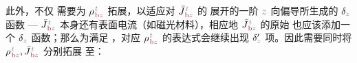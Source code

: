 此外，不仅  需要为 ${\rho}^{\;\!\mathcolor{gray}{t}}_{\;\!\textcolor{Maroon}{\text{b}}\mathcolor{gray}{z}}$ 拓展，以适应对 $\bar{J}^{\;\!\mathcolor{gray}{t}}_{\;\!\textcolor{Maroon}{\text{b}}\mathcolor{gray}{z}}$ 的  展开的一阶 $\mathcolor{gray}{z}$ 向偏导所生成的 $\delta_{\mathcolor{gray}{z}}$ 函数  ---  $\bar{J}^{\;\!\mathcolor{gray}{t}}_{\;\!\textcolor{Maroon}{\text{b}}\mathcolor{gray}{z}}$ 本身还有表面电流（如磁光材料），相应地 $\bar{J}^{\;\!\mathcolor{gray}{t}}_{\;\!\textcolor{Maroon}{\text{b}}\mathcolor{gray}{z}}$ 的原始  也应该添加一个 $\delta_{\mathcolor{gray}{z}}$ 函数；那么为满足 ，对应 ${\rho}^{\;\!\mathcolor{gray}{t}}_{\;\!\textcolor{Maroon}{\text{b}}\mathcolor{gray}{z}}$ 的表达式会继续出现 $\delta'_{\mathcolor{gray}{z}}$ 项。因此需要同时将 ${\rho}^{\;\!\mathcolor{gray}{t}}_{\;\!\textcolor{Maroon}{\text{b}}\mathcolor{gray}{z}},\bar{J}^{\;\!\mathcolor{gray}{t}}_{\;\!\textcolor{Maroon}{\text{b}}\mathcolor{gray}{z}}$ 分别拓展  至：
